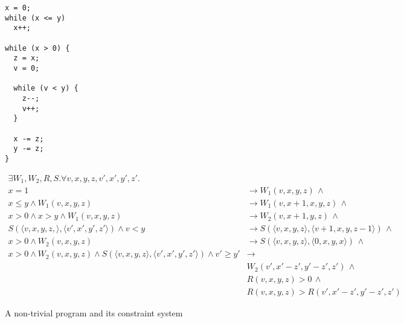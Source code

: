 \documentclass[preprint]{sigplanconf}
\theoremstyle{definition}
\begin{document}
\begin{figure*}
\begin{framed}
\begin{minipage}{0.19\textwidth}
\begin{lstlisting}
x = 0;
while (x <= y)
  x++;

while (x > 0) {
  z = x;
  v = 0;

  while (v < y) {
    z--;
    v++;
  }

  x -= z;
  y -= z;
}
\end{lstlisting}
\end{minipage}
\vline
\begin{minipage}{0.82\textwidth}
\begin{align*}
 \exists W_1, W_2, R, S . \forall v, x, y, z, v', x', y', z' . \\
   x = 1 & \rightarrow W_1(v, x, y, z) \, \wedge \\
   x \leq y \wedge W_1(v, x, y, z) & \rightarrow W_1(v, x+1, x, y, z) \, \wedge \\
   x > 0 \wedge x > y \wedge W_1(v, x, y, z) & \rightarrow W_2(v, x+1, y, z) \, \wedge \\
   S(\langle v, x, y, z, \rangle, \langle v', x', y', z' \rangle) \wedge v < y & \rightarrow S(\langle v, x, y, z \rangle, \langle v+1, x, y, z-1 \rangle) \, \wedge \\
   x > 0 \wedge W_2(v, x, y, z) & \rightarrow S(\langle v, x, y, z \rangle, \langle 0, x, y, x \rangle) \, \wedge \\
   x > 0 \wedge W_2(v, x, y, z) \wedge S(\langle v, x, y, z \rangle, \langle v', x', y', z' \rangle) \wedge v' \geq y' & \rightarrow \\
   & W_2(v', x' - z', y' - z', z') \, \wedge \\
   & R(v, x, y, z) > 0 \, \wedge \\
   & R(v, x, y, z) > R(v', x' - z', y'-z', z')
\end{align*}
\end{minipage}
\caption{A non-trivial program and its constraint system\label{fig:environment-model}}
\end{framed}
\end{figure*}
\end{document}
